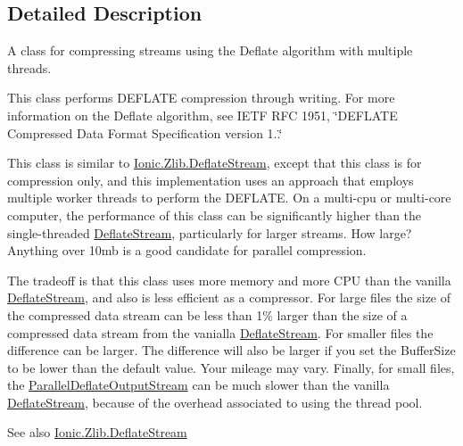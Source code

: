 \subsection{Detailed Description}
A class for compressing streams using the Deflate algorithm with multiple threads. 

This class performs D\+E\+F\+L\+A\+TE compression through writing. For more information on the Deflate algorithm, see I\+E\+TF R\+FC 1951, \char`\"{}\+D\+E\+F\+L\+A\+T\+E Compressed Data Format Specification version 1..\char`\"{} 

This class is similar to \mbox{\hyperlink{class_super_tiled2_unity_1_1_ionic_1_1_zlib_1_1_deflate_stream}{Ionic.\+Zlib.\+Deflate\+Stream}}, except that this class is for compression only, and this implementation uses an approach that employs multiple worker threads to perform the D\+E\+F\+L\+A\+TE. On a multi-\/cpu or multi-\/core computer, the performance of this class can be significantly higher than the single-\/threaded \mbox{\hyperlink{class_super_tiled2_unity_1_1_ionic_1_1_zlib_1_1_deflate_stream}{Deflate\+Stream}}, particularly for larger streams. How large? Anything over 10mb is a good candidate for parallel compression. 

The tradeoff is that this class uses more memory and more C\+PU than the vanilla \mbox{\hyperlink{class_super_tiled2_unity_1_1_ionic_1_1_zlib_1_1_deflate_stream}{Deflate\+Stream}}, and also is less efficient as a compressor. For large files the size of the compressed data stream can be less than 1\% larger than the size of a compressed data stream from the vanialla \mbox{\hyperlink{class_super_tiled2_unity_1_1_ionic_1_1_zlib_1_1_deflate_stream}{Deflate\+Stream}}. For smaller files the difference can be larger. The difference will also be larger if you set the Buffer\+Size to be lower than the default value. Your mileage may vary. Finally, for small files, the \mbox{\hyperlink{class_super_tiled2_unity_1_1_ionic_1_1_zlib_1_1_parallel_deflate_output_stream}{Parallel\+Deflate\+Output\+Stream}} can be much slower than the vanilla \mbox{\hyperlink{class_super_tiled2_unity_1_1_ionic_1_1_zlib_1_1_deflate_stream}{Deflate\+Stream}}, because of the overhead associated to using the thread pool. 

\begin{DoxySeeAlso}{See also}
\mbox{\hyperlink{class_super_tiled2_unity_1_1_ionic_1_1_zlib_1_1_deflate_stream}{Ionic.\+Zlib.\+Deflate\+Stream}}


\end{DoxySeeAlso}


